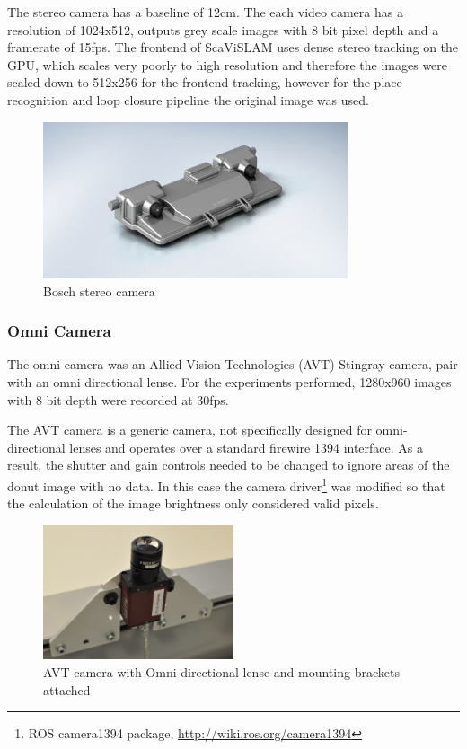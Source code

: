 The stereo camera has a baseline of 12cm.  The each video camera has a resolution of 1024x512, outputs grey scale images with 8 bit pixel depth and a framerate of 15fps.  The frontend of ScaViSLAM uses dense stereo tracking on the GPU, which scales very poorly to high resolution and therefore the images were scaled down to 512x256 for the frontend tracking, however for the place recognition and loop closure pipeline the original image was used.

\begin{figure}[H]
  \centering
    \includegraphics[width=0.8\textwidth]{chapters/images/svc}
  \caption{Bosch stereo camera}
\end{figure}

\subsubsection{Omni Camera}

The omni camera was an Allied Vision Technologies (AVT) Stingray camera, pair with an omni directional lense.  For the experiments performed, 1280x960 images with 8 bit depth were recorded at 30fps.  

The AVT camera is a generic camera, not specifically designed for omni-directional lenses and operates over a standard firewire 1394 interface.  As a result, the shutter and gain controls needed to be changed to ignore areas of the donut image with no data.  In this case the camera driver\footnote{ROS camera1394 package, \url{http://wiki.ros.org/camera1394}} was modified so that the calculation of the image brightness only considered valid pixels.


\begin{figure}[H]
  \centering
    \includegraphics[width=0.5\textwidth]{chapters/images/omni_cam_image}
  \caption{AVT camera with Omni-directional lense and mounting brackets attached}
\end{figure}


